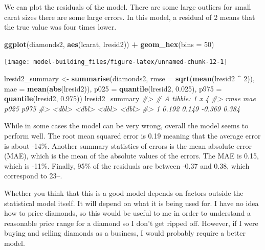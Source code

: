 \documentclass[]{book}
\newenvironment{Shaded}{\begin{snugshade}}{\end{snugshade}}
\newcommand{\CommentTok}[1]{\textcolor[rgb]{0.56,0.35,0.01}{\textit{#1}}}
\newcommand{\DataTypeTok}[1]{\textcolor[rgb]{0.13,0.29,0.53}{#1}}
\newcommand{\DecValTok}[1]{\textcolor[rgb]{0.00,0.00,0.81}{#1}}
\newcommand{\FloatTok}[1]{\textcolor[rgb]{0.00,0.00,0.81}{#1}}
\newcommand{\KeywordTok}[1]{\textcolor[rgb]{0.13,0.29,0.53}{\textbf{#1}}}
\newcommand{\NormalTok}[1]{#1}
\newcommand{\OperatorTok}[1]{\textcolor[rgb]{0.81,0.36,0.00}{\textbf{#1}}}
\newcommand{\StringTok}[1]{\textcolor[rgb]{0.31,0.60,0.02}{#1}}
\theoremstyle{plain}
\theoremstyle{remark}
\begin{document}
We can plot the residuals of the model. There are some large outliers for
small carat sizes there are some large errors. In this model, a residual of 2
means that the true value was four times lower.

\begin{Shaded}
\begin{Highlighting}[]
\KeywordTok{ggplot}\NormalTok{(diamonds2, }\KeywordTok{aes}\NormalTok{(lcarat, lresid2)) }\OperatorTok{+}\StringTok{ }
\StringTok{  }\KeywordTok{geom_hex}\NormalTok{(}\DataTypeTok{bins =} \DecValTok{50}\NormalTok{)}
\end{Highlighting}
\end{Shaded}

\begin{center}\texttt{[image: model-building\_files/figure-latex/unnamed-chunk-12-1]} \end{center}

\begin{Shaded}
\begin{Highlighting}[]
\NormalTok{lresid2_summary <-}\StringTok{ }\KeywordTok{summarise}\NormalTok{(diamonds2,}
          \DataTypeTok{rmse =} \KeywordTok{sqrt}\NormalTok{(}\KeywordTok{mean}\NormalTok{(lresid2 }\OperatorTok{^}\StringTok{ }\DecValTok{2}\NormalTok{)),}
          \DataTypeTok{mae =} \KeywordTok{mean}\NormalTok{(}\KeywordTok{abs}\NormalTok{(lresid2)),}
          \DataTypeTok{p025 =} \KeywordTok{quantile}\NormalTok{(lresid2, }\FloatTok{0.025}\NormalTok{),}
          \DataTypeTok{p975 =} \KeywordTok{quantile}\NormalTok{(lresid2, }\FloatTok{0.975}\NormalTok{))}
\NormalTok{lresid2_summary}
\CommentTok{#> # A tibble: 1 x 4}
\CommentTok{#>    rmse   mae   p025  p975}
\CommentTok{#>   <dbl> <dbl>  <dbl> <dbl>}
\CommentTok{#> 1 0.192 0.149 -0.369 0.384}
\end{Highlighting}
\end{Shaded}

While in some cases the model can be very wrong, overall the model seems to perform well.
The root mean squared error is 0.19 meaning that the
average error is about -14\%.
Another summary statistics of errors is the mean absolute error (MAE), which is the
mean of the absolute values of the errors.
The MAE is 0.15, which is -11\%.
Finally, 95\% of the residuals are between -0.37 and
0.38, which correspond to 23--.

Whether you think that this is a good model depends on factors outside the statistical model itself.
It will depend on what it is being used for.
I have no idea how to price diamonds, so this would be useful to me in order to understand a reasonable price range for a diamond so I don't get ripped off.
However, if I were buying and selling diamonds as a business, I would probably require a better model.
\end{document}
